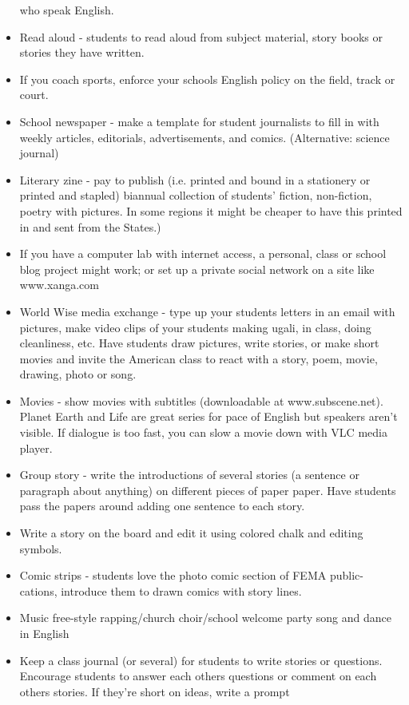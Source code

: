 \begin{itemize}
who speak English.  
\item Read aloud - students to read aloud from subject material, story books
or stories they have written.  
\item If you coach sports, enforce your schools English policy on the field,
track or court. 
\item School newspaper - make a template for student journalists to fill
in with weekly articles, editorials, advertisements, and comics. (Alternative:
science journal)  
\item Literary zine - pay to publish (i.e. printed and bound in a stationery
or printed and stapled) biannual collection of students' fiction,
non-fiction, poetry with pictures. In some regions it might be cheaper
to have this printed in and sent from the States.)  
\item If you have a computer lab with internet access, a personal, class
or school blog project might work; or set up a private social network
on a site like www.xanga.com 
\item World Wise media exchange - type up your students letters in an email
with pictures, make video clips of your students making ugali, in
class, doing cleanliness, etc. Have students draw pictures, write
stories, or make short movies and invite the American class to react
with a story, poem, movie, drawing, photo or song. 
\item Movies - show movies with subtitles (downloadable at www.subscene.net).
Planet Earth and Life are great series for pace of English but speakers
aren't visible. If dialogue is too fast, you can slow a movie down
with VLC media player.
\item Group story - write the introductions of several stories (a sentence
or paragraph about anything) on different pieces of paper paper. Have
students pass the papers around adding one sentence to each story. 
\item Write a story on the board and edit it using colored chalk and editing
symbols. 
\item Comic strips - students love the photo comic section of FEMA public-
cations, introduce them to drawn comics with story lines.  
\item Music free-style rapping/church choir/school welcome party song and
dance in English 
\item Keep a class journal (or several) for students to write stories or
questions. Encourage students to answer each others questions or comment
on each others stories. If they're short on ideas, write a prompt

\end{itemize}
